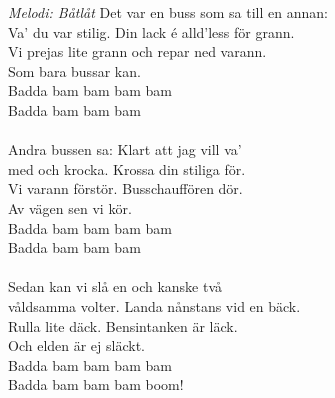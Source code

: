 {\footnotesize\textit{Melodi: Båtlåt}}
\vspace{10pt}
Det var en buss som sa till en annan:\\
Va' du var stilig. Din lack é alld'less för grann.\\
Vi prejas lite grann och repar ned varann.\\
Som bara bussar kan.\\
Badda bam bam bam bam\\
Badda bam bam bam\\
\\
Andra bussen sa: Klart att jag vill va'\\
med och krocka. Krossa din stiliga för.\\
Vi varann förstör. Busschauffören dör.\\
Av vägen sen vi kör.\\
Badda bam bam bam bam\\
Badda bam bam bam\\
\\
Sedan kan vi slå en och kanske två\\
våldsamma volter. Landa nånstans vid en bäck.\\
Rulla lite däck. Bensintanken är läck.\\
Och elden är ej släckt.\\
Badda bam bam bam bam\\
Badda bam bam bam boom!

